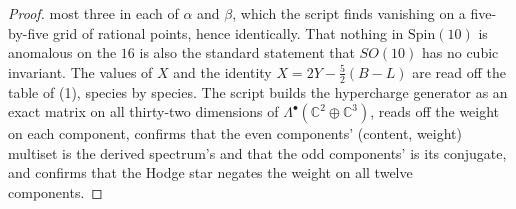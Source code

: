 \documentclass[11pt]{article}
\theoremstyle{definition}
\theoremstyle{plain}
\providecommand{\C}{}\renewcommand{\C}{\mathbb{C}}
\begin{document}
\begin{proof}
most three in each of $\alpha$ and $\beta$, which the script finds vanishing on a five-by-five grid of rational points, hence identically. That nothing in $\mathrm{Spin}(10)$ is anomalous on the $16$ is also the standard statement that $SO(10)$ has no cubic invariant. The values of $X$ and the identity $X = 2Y - \tfrac52(B - L)$ are read off the table of (1), species by species. The script builds the hypercharge generator as an exact matrix on all thirty-two dimensions of $\Lambda^{\bullet}(\C^{2} \oplus \C^{3})$, reads off the weight on each component, confirms that the even components' (content, weight) multiset is the derived spectrum's and that the odd components' is its conjugate, and confirms that the Hodge star negates the weight on all twelve components.

\end{proof}
\end{document}
